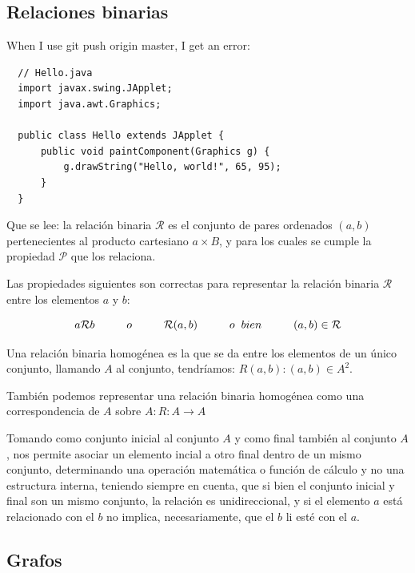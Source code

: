 \documentclass[10pt]{article}
\begin{document}
\subsection{Relaciones binarias}

When I use git push origin master, I get an error:

\begin{lstlisting}
  // Hello.java
  import javax.swing.JApplet;
  import java.awt.Graphics;
  
  public class Hello extends JApplet {
      public void paintComponent(Graphics g) {
          g.drawString("Hello, world!", 65, 95);
      }    
  }
\end{lstlisting}



Que se lee: la relación binaria $\mathcal{R}$ es el conjunto de pares ordenados $(a,b)$ pertenecientes al producto cartesiano $a\times B$, y para los cuales se cumple la propiedad $\mathcal{P}$ que los relaciona.

Las propiedades siguientes son correctas para representar la relación binaria $\mathcal{R}$ entre los elementos $a$ y $b$:

$$
a\mathcal{R}b \hspace{1cm} o \hspace{1cm}\mathcal{R}(a,b)\hspace{1cm} o\hspace{0.2cm}bien\hspace{1cm}(a,b) \in \mathcal{R}
$$

Una relación binaria homogénea es la que se da entre los elementos de un único conjunto, llamando $A$ al conjunto, tendríamos: $R(a,b) : (a,b) \in A^2$.

También podemos representar una relación binaria homogénea como una correspondencia de $A$ sobre $A: R: A \rightarrow A$

Tomando como conjunto inicial al conjunto $A$ y como final también al conjunto $A$, nos permite asociar un elemento incial a otro final dentro de un mismo conjunto, determinando una operación matemática o función de cálculo y no una estructura interna, teniendo siempre en cuenta, que si bien el conjunto inicial y final son un mismo conjunto, la relación es unidireccional, y si el elemento $a$ está relacionado con el $b$ no implica, necesariamente, que el $b$ li esté con el $a$.


\subsection{Grafos}
\end{document}
